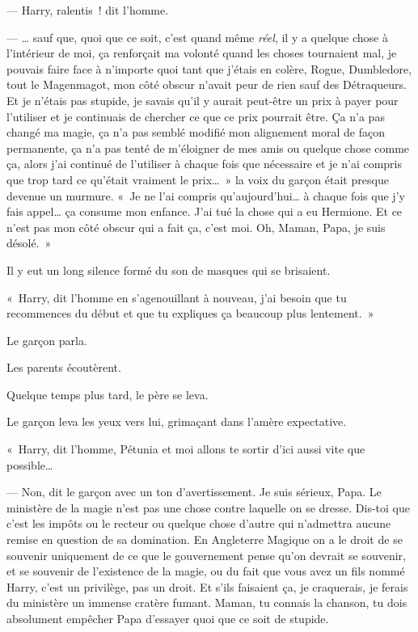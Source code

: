 --- Harry, ralentis~! dit l'homme.

--- … sauf que, quoi que ce soit, c'est quand même \emph{réel}, il y a quelque chose à l'intérieur de moi, ça renforçait ma volonté quand les choses tournaient mal, je pouvais faire face à n'importe quoi tant que j'étais en colère, Rogue, Dumbledore, tout le Magenmagot, mon côté obscur n'avait peur de rien sauf des Détraqueurs. Et je n'étais pas stupide, je savais qu'il y aurait peut-être un prix à payer pour l'utiliser et je continuais de chercher ce que ce prix pourrait être. Ça n'a pas changé ma magie, ça n'a pas semblé modifié mon alignement moral de façon permanente, ça n'a pas tenté de m'éloigner de mes amis ou quelque chose comme ça, alors j'ai continué de l'utiliser à chaque fois que nécessaire et je n'ai compris que trop tard ce qu'était vraiment le prix…~» la voix du garçon était presque devenue un murmure. «~Je ne l'ai compris qu'aujourd'hui… à chaque fois que j'y fais appel… ça consume mon enfance. J'ai tué la chose qui a eu Hermione. Et ce n'est pas mon côté obscur qui a fait ça, c'est moi. Oh, Maman, Papa, je suis désolé.~»

Il y eut un long silence formé du son de masques qui se brisaient.

«~Harry, dit l'homme en s'agenouillant à nouveau, j'ai besoin que tu recommences du début et que tu expliques ça beaucoup plus lentement.~»

Le garçon parla.

Les parents écoutèrent.

Quelque temps plus tard, le père se leva.

Le garçon leva les yeux vers lui, grimaçant dans l'amère expectative.

«~Harry, dit l'homme, Pétunia et moi allons te sortir d'ici aussi vite que possible…

--- Non, dit le garçon avec un ton d'avertissement. Je suis sérieux, Papa. Le ministère de la magie n'est pas une chose contre laquelle on se dresse. Dis-toi que c'est les impôts ou le recteur ou quelque chose d'autre qui n'admettra aucune remise en question de sa domination. En Angleterre Magique on a le droit de se souvenir uniquement de ce que le gouvernement pense qu'on devrait se souvenir, et se souvenir de l'existence de la magie, ou du fait que vous avez un fils nommé Harry, c'est un privilège, pas un droit. Et s'ils faisaient ça, je craquerais, je ferais du ministère un immense cratère fumant. Maman, tu connais la chanson, tu dois absolument empêcher Papa d'essayer quoi que ce soit de stupide.

